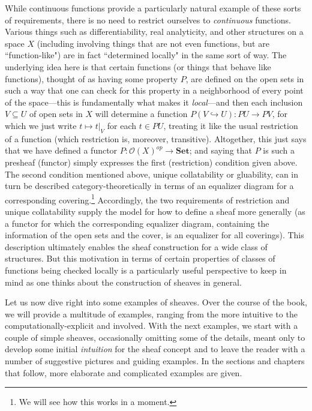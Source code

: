 \documentclass[11pt]{book}
\theoremstyle{definition}
\theoremstyle{definition}
\theoremstyle{definition}
\theoremstyle{theorem}
\theoremstyle{definition}
\begin{document}
While continuous functions provide a particularly natural example of these sorts of requirements, there is no need to restrict ourselves to \textit{continuous} functions. Various things such as differentiability, real analyticity, and other structures on a space $X$ (including involving things that are not even functions, but are ``function-like") are in fact ``determined locally" in the same sort of way. The underlying idea here is that certain functions (or things that behave like functions), thought of as having some property $P$, are defined on the open sets in such a way that one can check for this property in a neighborhood of every point of the space---this is fundamentally what makes it \textit{local}---and then each inclusion $V \subseteq U$ of open sets in $X$ will determine a function $P(V \hookrightarrow U): PU \rightarrow PV$, for which we just write $t \mapsto t|_V$ for each $t \in PU$, treating it like the usual restriction of a function (which restriction is, moreover, transitive). Altogether, this just says that we have defined a functor $P: \mathscr{O}(X)^{op} \rightarrow \textbf{Set}$; and saying that $P$ is such a presheaf (functor) simply expresses the first (restriction) condition given above. The second condition mentioned above, unique collatability or gluability, can in turn be described category-theoretically in terms of an equalizer diagram for a corresponding covering.\footnote{We will see how this works in a moment.} Accordingly, the two requirements of restriction and unique collatability supply the model for how to define a sheaf more generally (as a functor for which the corresponding equalizer diagram, containing the information of the open sets and the cover, is an equalizer for all coverings). This description ultimately enables the sheaf construction for a wide class of structures. But this motivation in terms of certain properties of classes of functions being checked locally is a particularly useful perspective to keep in mind as one thinks about the construction of sheaves in general.\par 
	Let us now dive right into some examples of sheaves. Over the course of the book, we will provide a multitude of examples, ranging from the more intuitive to the computationally-explicit and involved. With the next examples, we start with a couple of simple sheaves, occasionally omitting some of the details, meant only to develop some initial \textit{intuition} for the sheaf concept and to leave the reader with a number of suggestive pictures and guiding examples. In the sections and chapters that follow, more elaborate and complicated examples are given.
\end{document}
